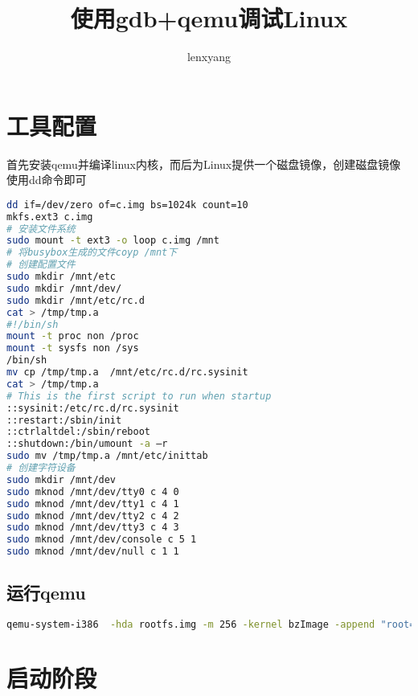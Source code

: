 \documentclass[b5paper,9pt,twoside,openany]{article}
\begin{document}
\title{使用gdb+qemu调试Linux}
\author{lenxyang}
\maketitle
\section{工具配置}
首先安装qemu并编译linux内核，而后为Linux提供一个磁盘镜像，创建磁盘镜像使用dd命令即可
\begin{lstlisting}[language=bash]
dd if=/dev/zero of=c.img bs=1024k count=10
mkfs.ext3 c.img
# 安装文件系统
sudo mount -t ext3 -o loop c.img /mnt
# 将busybox生成的文件coyp /mnt下
# 创建配置文件
sudo mkdir /mnt/etc
sudo mkdir /mnt/dev/
sudo mkdir /mnt/etc/rc.d
cat > /tmp/tmp.a
#!/bin/sh
mount -t proc non /proc
mount -t sysfs non /sys
/bin/sh
mv cp /tmp/tmp.a  /mnt/etc/rc.d/rc.sysinit
cat > /tmp/tmp.a
# This is the first script to run when startup
::sysinit:/etc/rc.d/rc.sysinit
::restart:/sbin/init
::ctrlaltdel:/sbin/reboot
::shutdown:/bin/umount -a –r
sudo mv /tmp/tmp.a /mnt/etc/inittab
# 创建字符设备
sudo mkdir /mnt/dev
sudo mknod /mnt/dev/tty0 c 4 0
sudo mknod /mnt/dev/tty1 c 4 1
sudo mknod /mnt/dev/tty2 c 4 2
sudo mknod /mnt/dev/tty3 c 4 3
sudo mknod /mnt/dev/console c 5 1
sudo mknod /mnt/dev/null c 1 1
\end{lstlisting}

\subsection{运行qemu}
\begin{lstlisting}[language=bash]
qemu-system-i386  -hda rootfs.img -m 256 -kernel bzImage -append "root=/dev/hda"
\end{lstlisting}

\section{启动阶段} 
\end{document}
